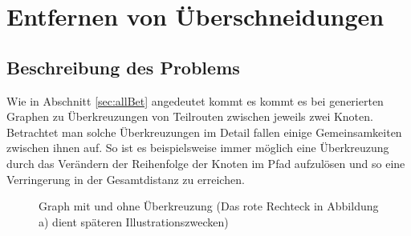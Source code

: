 \section{Entfernen von Überschneidungen}
\subsection{Beschreibung des Problems}
Wie in Abschnitt \vref{sec:allBet} angedeutet kommt es kommt es bei generierten Graphen zu Überkreuzungen von Teilrouten zwischen jeweils zwei Knoten.
Betrachtet man solche Überkreuzungen im Detail fallen einige Gemeinsamkeiten zwischen ihnen auf.
So ist es beispielsweise immer möglich eine Überkreuzung durch das Verändern der Reihenfolge der Knoten im Pfad aufzulösen und so eine Verringerung in der Gesamtdistanz zu erreichen.

\begin{figure}[h]
    \begin{center}
        \hfil
        \caption{Graph mit und ohne Überkreuzung (Das rote Rechteck in Abbildung a) dient späteren Illustrationszwecken)}\label{fig:graph-with-and-without-crossover}
    \end{center}
\end{figure}

